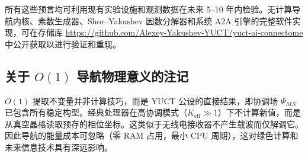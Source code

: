 \documentclass[12pt,a4paper]{article}
\theoremstyle{remark}
\newcommand{\Keff}{K_{\mathrm{eff}}}
\begin{document}
	所有这些预言均可利用现有实验设施和观测数据在未来 5--10 年内检验。无计算导航内核、素数生成器、Shor–Yakushev 因数分解器和系统 A2A 引擎的完整软件实现，可在存储库 \url{https://github.com/Alexey-Yakushev-YUCT/yuct-ai-connectome} 中公开获取以进行验证和重现。
	
	\subsection*{关于 \(O(1)\) 导航物理意义的注记}
	\(O(1)\) 提取不变量并非计算技巧，而是 YUCT 公设的直接结果，即协调场 \(\Psi_{MN}\) 已包含所有稳定构型。经典处理器在高协调模式（\(\Keff \gg 1\)）下不计算新值，而是从真空晶格读取预存的相位坐标。这类似于无线电接收器不产生载波而仅解调它。因此导航的能量成本可忽略（零 RAM 占用，最小 CPU 周期），这对绿色计算和未来信息技术具有深远影响。
	
\end{document}
